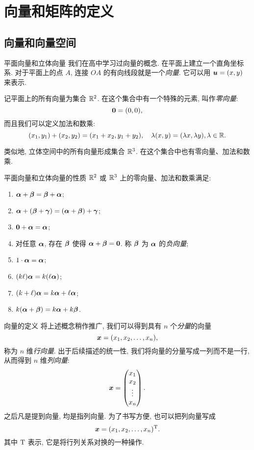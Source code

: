 \section{向量和矩阵的定义}


\subsection{向量和向量空间}
\begin{frame}{平面向量和立体向量}
	\onslide<+->
	我们在高中学习过向量的概念.
	\onslide<+->
	在平面上建立一个直角坐标系. 对于平面上的点 $A$, 连接 $OA$ 的有向线段就是一个\emph{向量}.
	\onslide<+->
	它可以用 ${\boldsymbol{u}}=(x,y)$ 来表示.

	\onslide<+->
	记平面上的所有向量为集合 ${\mathbb{R}}^2$.
	\onslide<+->
	在这个集合中有一个特殊的元素, 叫作\emph{零向量}:
	\[{\bf0}=(0,0),\]
	\onslide<+->
	而且我们可以定义加法和数乘:
	\[(x_1,y_1)+(x_2,y_2)=(x_1+x_2,y_1+y_2),\quad
	\lambda(x,y)=(\lambda x,\lambda y),\lambda\in{\mathbb{R}}.\]

	\onslide<+->
	类似地, 立体空间中的所有向量形成集合 ${\mathbb{R}}^3$.
	\onslide<+->
	在这个集合中也有零向量、加法和数乘.
\end{frame}


\begin{frame}{平面向量和立体向量的性质}
	\onslide<+->
	${\mathbb{R}}^2$ 或 ${\mathbb{R}}^3$ 上的零向量、加法和数乘满足:
	\begin{enumerate}
		\item ${\boldsymbol{\alpha}}+{\boldsymbol{\beta}}={\boldsymbol{\beta}}+{\boldsymbol{\alpha}}$;
		\item ${\boldsymbol{\alpha}}+({\boldsymbol{\beta}}+{\boldsymbol{\gamma}})=({\boldsymbol{\alpha}}+{\boldsymbol{\beta}})+{\boldsymbol{\gamma}}$;
		\item ${\bm0}+{\boldsymbol{\alpha}}={\boldsymbol{\alpha}}$;
		\item 对任意 ${\boldsymbol{\alpha}}$, 存在 ${\boldsymbol{\beta}}$ 使得 ${\boldsymbol{\alpha}}+{\boldsymbol{\beta}}={\bf0}$. 称 ${\boldsymbol{\beta}}$ 为 ${\boldsymbol{\alpha}}$ 的\emph{负向量};
		\item $1\cdot{\boldsymbol{\alpha}}={\boldsymbol{\alpha}}$;
		\item $(k\ell){\boldsymbol{\alpha}}=k(\ell{\boldsymbol{\alpha}})$;
		\item $(k+\ell){\boldsymbol{\alpha}}=k{\boldsymbol{\alpha}}+\ell{\boldsymbol{\alpha}}$;
		\item $k({\boldsymbol{\alpha}}+{\boldsymbol{\beta}})=k{\boldsymbol{\alpha}}+k{\boldsymbol{\beta}}$.
	\end{enumerate}
\end{frame}


\begin{frame}{向量的定义}
	\onslide<+->
	将上述概念稍作推广, 我们可以得到具有 $n$ 个\emph{分量}的向量
	\[{\boldsymbol{x}}=(x_1,x_2,\dots,x_n),\]
	称为 $n$ 维\emph{行向量}.
	\onslide<+->
	出于后续描述的统一性, 我们将向量的分量写成一列而不是一行, 从而得到 $n$ 维\emph{列向量}:
	\[{\boldsymbol{x}}=\begin{pmatrix}
		x_1\\
		x_2\\
		\vdots\\
		x_n
	\end{pmatrix}.\]
	\onslide<+->
	\alert{之后凡是提到向量, 均是指列向量}.
	\onslide<+->
	为了书写方便, 也可以把列向量写成
	\[{\boldsymbol{x}}=(x_1,x_2,\dots,x_n)^{\mathrm{T}}.\]
	其中 ${\mathrm{T}}$ 表示, 它是将行列关系对换的一种操作.
\end{frame}


